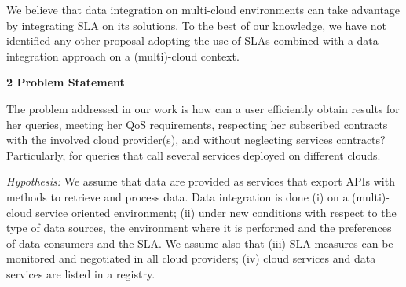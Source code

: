 \documentclass[11pt,a4paper,oneside]{report}
\begin{document}
%
%

We believe that data integration on multi-cloud environments can take advantage by integrating SLA on its solutions. To the best of our knowledge, we have not identified any other proposal adopting the use of SLAs combined with a data integration approach on a (multi)-cloud context.

\begin{flushleft}
\textbf{2 Problem Statement}\\
\end{flushleft}
The problem addressed in our work is how can a user efficiently obtain results for her queries, meeting her QoS requirements, respecting her subscribed contracts with the involved cloud provider(s), and without neglecting services contracts? 
Particularly, for queries that call several services deployed on different clouds.

\noindent
{\em Hypothesis:}  We assume that data are provided as services that export APIs with methods to retrieve  and process data. Data integration is done (i) on a (multi)-cloud service oriented environment;  (ii) under new conditions with respect to the type of data sources, the environment where it is performed and the preferences  of data consumers and the SLA. We assume also that (iii) SLA measures can be monitored and negotiated in all cloud providers; (iv) cloud services and data services are listed in a registry.

\end{document}
